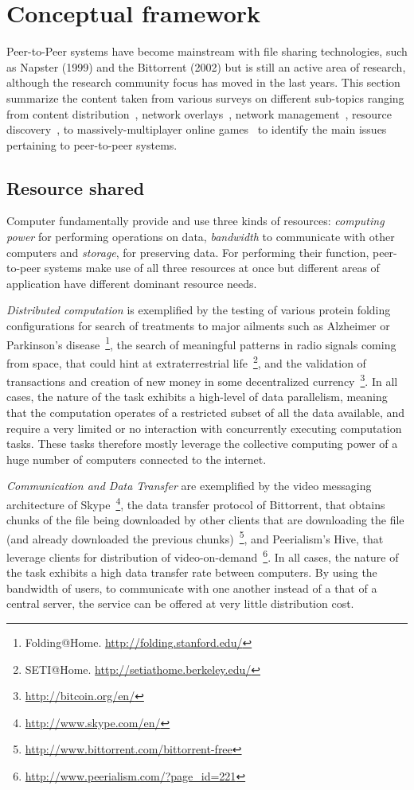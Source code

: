\section{Conceptual framework}

Peer-to-Peer systems have become mainstream with file sharing technologies, such as Napster (1999) and the Bittorrent (2002) but is still an active area of research, although the research community focus has moved in the last years. This section summarize the content taken from various surveys on different sub-topics ranging from content distribution~\cite{Androutsellis-Theotokis:2004}, network overlays~\cite{Lua:2005}, network management~\cite{Amad:2012}, resource discovery~\cite{Lazaro:2013}, to massively-multiplayer online games~\cite{Yahyavi:2014} to identify the main issues pertaining to peer-to-peer systems.

\subsection{Resource shared}

Computer fundamentally provide and use three kinds of resources: \textit{computing power} for performing operations on data, \textit{bandwidth} to communicate with other computers and \textit{storage}, for preserving data. For performing their function, peer-to-peer systems make use of all three resources at once but different areas of application have different dominant resource needs.

\textit{Distributed computation} is exemplified by the testing of various protein folding configurations for search of treatments to major ailments such as Alzheimer or Parkinson's disease~\footnote{Folding@Home. \url{http://folding.stanford.edu/}}, the search of meaningful patterns in radio signals coming from space, that could hint at extraterrestrial life~\footnote{SETI@Home. \url{http://setiathome.berkeley.edu/}}, and the validation of transactions and creation of new money in some decentralized currency~\footnote{\url{http://bitcoin.org/en/}}. In all cases, the nature of the task exhibits a high-level of data parallelism, meaning that the computation operates of a restricted subset of all the data available, and require a very limited or no interaction with concurrently executing computation tasks. These tasks therefore mostly leverage the collective computing power of a huge number of computers connected to the internet.

\textit{Communication and Data Transfer} are exemplified by the video messaging architecture of Skype~\footnote{\url{http://www.skype.com/en/}}, the data transfer protocol of Bittorrent, that obtains chunks of the file being downloaded by other clients that are downloading the file (and already downloaded the previous chunks)~\footnote{\url{http://www.bittorrent.com/bittorrent-free}}, and Peerialism's Hive, that leverage clients for distribution of video-on-demand~\footnote{\url{http://www.peerialism.com/?page_id=221}}. In all cases, the nature of the task exhibits a high data transfer rate between computers. By using the bandwidth of users, to communicate with one another instead of a that of a central server, the service can be offered at very little distribution cost.

